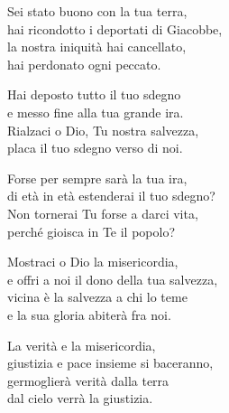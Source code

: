 

\spazio

\strofa Sei stato buono con la tua terra,\\
hai ricondotto i deportati di Giacobbe,\\
la nostra iniquità hai cancellato,\\
hai perdonato ogni peccato.

\spazio


\spazio

\strofa Hai deposto tutto il tuo sdegno\\
e messo fine alla tua grande ira.\\
Rialzaci  o Dio, Tu nostra salvezza,\\
placa il tuo sdegno verso di noi.

\spazio


\spazio

\strofa Forse per sempre sarà la tua ira,\\
di età in età estenderai il tuo sdegno?\\
Non tornerai Tu forse a darci vita,\\
perché gioisca in Te il popolo?

\spazio


\spazio

\strofa Mostraci o Dio la misericordia,\\
e offri a noi il dono della tua salvezza,\\
vicina è la salvezza a chi lo teme\\
e la sua gloria abiterà fra noi.

\spazio


\spazio

\strofa La verità e la misericordia,\\
giustizia e pace insieme si baceranno,\\
germoglierà verità dalla terra\\
dal cielo verrà la giustizia.

\spazio

